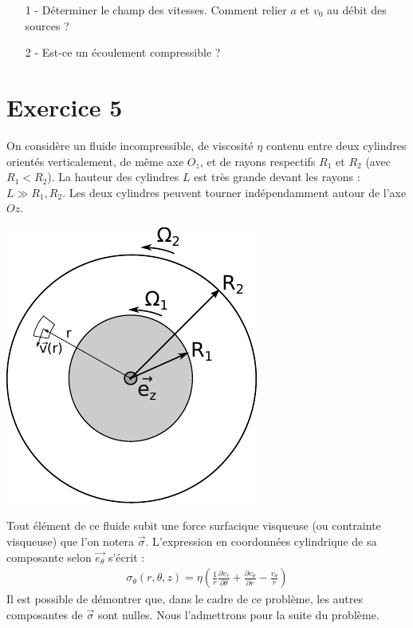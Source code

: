 \documentclass{report}
\begin{document}
\begin{itemize}
	\item[1 - ] Déterminer le champ des vitesses. Comment relier $a$ et $v_0$ au débit des sources ? 
	\item[2 - ] Est-ce un écoulement compressible ?
\end{itemize}

\newpage

\section*{Exercice 5}

On considère un fluide incompressible, de viscosité $\eta$ contenu entre deux cylindres orientés verticalement, de même axe $O_z$, et de rayons respectifs $R_1$ et $R_2$ (avec $R_1<R_2$). La hauteur des cylindres $L$ est très grande devant les rayons : $L\gg R_1, R_2$. Les deux cylindres peuvent tourner indépendamment autour de l'axe $Oz$. 

\begin{center}
	\includegraphics[scale=0.8]{meca_flu3.pdf}
\end{center}

Tout élément de ce fluide subit une force surfacique visqueuse (ou contrainte visqueuse) que l'on notera $\vec{\sigma}$. L'expression en coordonnées cylindrique de sa composante selon $\vec{e_\theta}$ s'écrit : 
\begin{align*}
	\sigma_\theta(r,\theta,z)=\eta\left(\frac{1}{r}\frac{\partial v_r}{\partial \theta}+ \frac{\partial v_\theta}{\partial r} - \frac{v_\theta}{r} \right)
\end{align*}
Il est possible de démontrer que, dans le cadre de ce problème, les autres composantes de $\vec{\sigma}$ sont nulles. Nous l'admettrons pour la suite du problème. 
\end{document}
